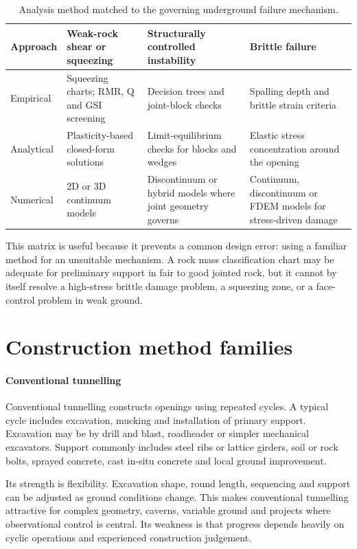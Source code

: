 \begin{table}[H]
\centering
\small
\begin{tabularx}{\textwidth}{p{} X X X}
\toprule
\textbf{Approach} & \textbf{Weak-rock shear or squeezing} & \textbf{Structurally controlled instability} & \textbf{Brittle failure} \\
\midrule
Empirical & Squeezing charts; RMR, Q and GSI screening & Decision trees and joint-block checks & Spalling depth and brittle strain criteria \\
Analytical & Plasticity-based closed-form solutions & Limit-equilibrium checks for blocks and wedges & Elastic stress concentration around the opening \\
Numerical & 2D or 3D continuum models & Discontinuum or hybrid models where joint geometry governs & Continuum, discontinuum or FDEM models for stress-driven damage \\
\bottomrule
\end{tabularx}
\caption{Analysis method matched to the governing underground failure mechanism.}
\label{tab:ch10-methods-by-failure}
\end{table}

This matrix is useful because it prevents a common design error: using a familiar method for an unsuitable mechanism. A rock mass classification chart may be adequate for preliminary support in fair to good jointed rock, but it cannot by itself resolve a high-stress brittle damage problem, a squeezing zone, or a face-control problem in weak ground.

\section{Construction method families}
\label{sec:construction-method-families}

\paragraph{Conventional tunnelling}
\label{sec:conventional-tunnelling}
Conventional tunnelling constructs openings using repeated cycles. A typical cycle includes excavation, mucking and installation of primary support. Excavation may be by drill and blast, roadheader or simpler mechanical excavators. Support commonly includes steel ribs or lattice girders, soil or rock bolts, sprayed concrete, cast in-situ concrete and local ground improvement.

Its strength is flexibility. Excavation shape, round length, sequencing and support can be adjusted as ground conditions change. This makes conventional tunnelling attractive for complex geometry, caverns, variable ground and projects where observational control is central. Its weakness is that progress depends heavily on cyclic operations and experienced construction judgement.

